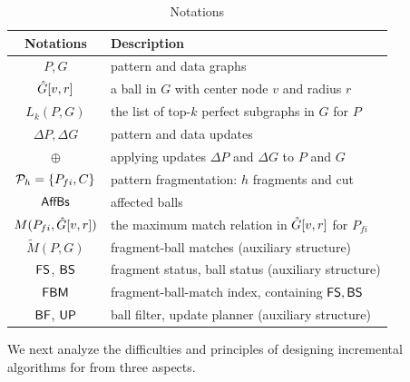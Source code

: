 \begin{table}[tb!]
	\begin{center}
		\begin{small}
			\scriptsize
			\begin{tabular}{|c|l|}
				\hline
				{\bf Notations}             &  {\bf Description}     \\
				\hline\hline
				$P,G$                     &  pattern and data graphs       \\ \hline
				$\hat{G}{[v, r]}$              &  a ball in $G$ with center node $v$ and radius $r$  \\ \hline
				$L_k(P, G)$                  &  the list of top-$k$ perfect subgraphs in $G$ for $P$  \\ \hline
				$\Delta P, \Delta G$       &  pattern and data updates       \\ \hline
				$\oplus$                    &  applying updates $\Delta P$ and $\Delta G$ to $P$ and $G$       \\ \hline
				${\cal P}_{h}=\{P_{fi}, C\}$     &  pattern fragmentation: $h$ fragments and cut    \\ \hline
				${\mathsf{AffBs}}$                &  affected balls       \\ \hline
				$M(P_{fi}, \hat{G}{[v,r]})$    &  the maximum match relation in $\hat{G}{[v,r]}$ for $P_{fi}$   \\ \hline
				$\tilde{M}(P,G)$            &  fragment-ball matches (auxiliary structure)     \\ \hline
				${\mathsf{FS}}$, ${\mathsf{BS}}$              &  fragment status, ball status (auxiliary structure) \\    \hline
				${\mathsf{FBM}}$                       &  fragment-ball-match index, containing ${\mathsf{FS}}, {\mathsf{BS}}$ \\    \hline
				${\mathsf{BF}}$, ${\mathsf{UP}}$              &  ball filter, update planner (auxiliary structure) \\    \hline
			\end{tabular}
			\vspace{-2ex}
		\end{small}
		\caption{Notations}
		\label{tab-notation}
		\vspace{-6ex}
	\end{center}
\end{table}


We next analyze the difficulties and principles of designing incremental algorithms for \dynteamF{} from three aspects.

